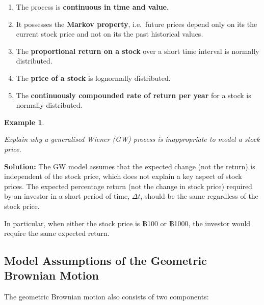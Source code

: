 \documentclass[landscape, 20pt]{extreport}
\theoremstyle{definition}
\theoremstyle{definition}
\newtheorem{example}{Example}[chapter]
\theoremstyle{definition}
\theoremstyle{definition}
\theoremstyle{remark}
\begin{document}
\begin{enumerate}
\def\labelenumi{\arabic{enumi}.}
\item
  The process is \textbf{continuous in time and value}.
\item
  It possesses the \textbf{Markov property}, i.e.~future prices depend only
  on its the current stock price and not on its the past historical
  values.
\item
  The \textbf{proportional return on a stock} over a short time interval is
  normally distributed.
\item
  The \textbf{price of a stock} is lognormally distributed.
\item
  The \textbf{continuously compounded rate of return per year} for a stock
  is normally distributed.
\end{enumerate}

\newpage \begin{example}
\protect\hypertarget{exm:unlabeled-div-71}{}\label{exm:unlabeled-div-71}

\emph{Explain why a generalised Wiener (GW) process is
inappropriate to model a stock price.}

\end{example}

\textbf{Solution:} The GW model assumes that the expected change (not the
return) is independent of the stock price, which does not explain a key
aspect of stock prices. The expected percentage return (not the change
in stock price) required by an investor in a short period of time,
\(\Delta t\), should be the same regardless of the stock price.

In particular, when either the stock price is ฿100 or ฿1000, the
investor would require the same expected return.

\hypertarget{model-assumptions-of-the-geometric-brownian-motion}{%
\subsection{Model Assumptions of the Geometric Brownian Motion}\label{model-assumptions-of-the-geometric-brownian-motion}}

The geometric Brownian motion also consists of two components:
\end{document}
